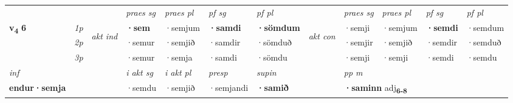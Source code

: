 \begin{longtable}[l]{X>{\footnotesize\itshape}llXXXXlXXXX}
\midrule

 & &   & \textit{praes sg}  & \textit{praes pl}    & \textit{ pf sg} & \textit{pf pl} & & \textit{praes sg}  & \textit{praes pl}    & \textit{pf sg} & \textit{pf pl }  \\ \cmidrule{4-7} \cmidrule{9-12}
 \multirow{2}{*}{{{\textbf{v{\textsubscript{4}}} \Large{\textbf{6}}}}}  & 1p & \multirow{3}{*}{\begin{turn}{90}\textit{akt ind}\end{turn}} & \textbf{·sem} & ·semjum & \textbf{·samdi} & \textbf{·sömdum} & \multirow{3}{*}{\begin{turn}{90}\textit{akt con}\end{turn}} &·semji & ·semjum & \textbf{·semdi} & ·semdum\\*
 & 2p &  &  ·semur  & ·semjið & ·samdir & ·sömduð & & ·semjir & ·semjið & ·semdir & ·semduð \\*
 & 3p &  & ·semur & ·semja & ·samdi & ·sömdu & & ·semji & ·semji& ·semdi & ·semdu \\*
\cmidrule{4-7} \cmidrule{9-12}

   {\textit{inf}} & &  & \textit{i akt sg} & \textit{i akt pl}   & \textit{presp} & \textit{supin}  && \textit{pp m} \\*
  {\textbf{endur\allowbreak ·semja}} & && ·semdu  & ·semjið   & ·semjandi &  \textbf{·samið}  && \multicolumn{2}{l}{\textbf{·saminn} adj\textbf{\textsubscript{6-8}}} \\*

\midrule


\end{longtable}
